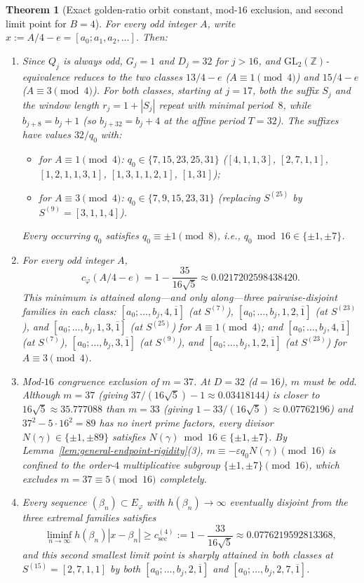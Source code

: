 \documentclass[11pt]{amsart}
\newtheorem{theorem}{Theorem}[section]
\theoremstyle{definition}
\theoremstyle{remark}
\numberwithin{equation}{section}
\newcommand{\Z}{\mathbb{Z}}
\begin{document}
\begin{theorem}[Exact golden-ratio orbit constant, mod-$16$ exclusion, and second limit point for $B=4$]\label{thm:golden-b4-exact}
For every odd integer $A$, write $x:=A/4-e=[a_0;a_1,a_2,\ldots]$. Then:
\begin{enumerate}
\item Since $Q_j$ is always odd, $G_j=1$ and $D_j=32$ for $j>16$, and
      $\mathrm{GL}_2(\Z)$-equivalence reduces to the two classes
      $13/4-e$ ($A\equiv1\pmod4$) and $15/4-e$ ($A\equiv3\pmod4$). For
      both classes, starting at $j=17$, both the suffix $S_j$ and the
      window length $r_j=1+|S_j|$ repeat with minimal period~$8$, while
      $b_{j+8}=b_j+1$ (so $b_{j+32}=b_j+4$ at the affine period $T=32$).
      The suffixes have values $32/q_0$ with:
      \begin{itemize}
      \item for $A\equiv1\pmod4$: $q_0\in\{7,15,23,25,31\}$
            ($[4,1,1,3]$, $[2,7,1,1]$, $[1,2,1,1,3,1]$, $[1,3,1,1,2,1]$, $[1,31]$);
      \item for $A\equiv3\pmod4$: $q_0\in\{7,9,15,23,31\}$
            (replacing $S^{(25)}$ by $S^{(9)}=[3,1,1,4]$).
      \end{itemize}
      Every occurring $q_0$ satisfies $q_0\equiv\pm1\pmod8$, i.e.,
      $q_0\bmod16\in\{\pm1,\pm7\}$.
\item For every odd integer $A$,
      \[
       c_\varphi(A/4-e)=1-\frac{35}{16\sqrt5}\approx 0.0217202598438420.
      \]
      This minimum is attained along—and only along—three pairwise-disjoint
      families in each class: $[a_0;\ldots,b_j,4,\overline1]$ (at $S^{(7)}$),
      $[a_0;\ldots,b_j,1,2,\overline1]$ (at $S^{(23)}$), and
      $[a_0;\ldots,b_j,1,3,\overline1]$ (at $S^{(25)}$) for $A\equiv1\pmod4$;
      and $[a_0;\ldots,b_j,4,\overline1]$ (at $S^{(7)}$),
      $[a_0;\ldots,b_j,3,\overline1]$ (at $S^{(9)}$), and
      $[a_0;\ldots,b_j,1,2,\overline1]$ (at $S^{(23)}$) for $A\equiv3\pmod4$.
\item \emph{Mod-$16$ congruence exclusion of $m=37$.} At $D=32$ ($d=16$),
      $m$ must be odd. Although $m=37$ (giving $37/(16\sqrt5)-1\approx0.03418144$)
      is closer to $16\sqrt5\approx35.777088$ than $m=33$ (giving
      $1-33/(16\sqrt5)\approx0.07762196$) and $37^2-5\cdot16^2=89$ has no
      inert prime factors, every divisor $N(\gamma)\in\{\pm1,\pm89\}$ satisfies
      $N(\gamma)\bmod16\in\{\pm1,\pm7\}$. By Lemma~\ref{lem:general-endpoint-rigidity}(3),
      $m\equiv-\varepsilon q_0N(\gamma)\pmod{16}$ is confined to the order-$4$
      multiplicative subgroup $\{\pm1,\pm7\}\pmod{16}$, which excludes
      $m=37\equiv5\pmod{16}$ completely.
\item Every sequence $(\beta_n)\subset E_\varphi$ with $h(\beta_n)\to\infty$
      eventually disjoint from the three extremal families satisfies
      \[
       \liminf_{n\to\infty} h(\beta_n)|x-\beta_n|
       \ge c_{\mathrm{sec}}^{(4)}:=1-\frac{33}{16\sqrt5}\approx 0.0776219592813368,
      \]
      and this second smallest limit point is sharply attained in both
      classes at $S^{(15)}=[2,7,1,1]$ by both $[a_0;\ldots,b_j,2,\overline1]$
      and $[a_0;\ldots,b_j,2,7,\overline1]$.
\end{enumerate}
\end{theorem}
\end{document}
